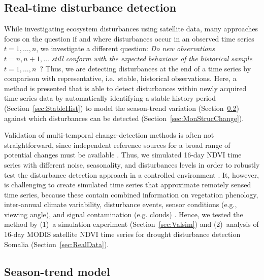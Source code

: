 \documentclass[authoryear,preprint,review,10pt]{elsarticle}
\begin{document}
\subsection{Real-time disturbance detection}\label{sec:Method}

While investigating ecosystem disturbances using satellite data, many approaches \citep[e.g.,][]{Verbesselt:2010wo, White2009} focus on the question if and where disturbances occur in an observed time series $t = 1, \dots, n$, we investigate a different question: \emph{Do new observations $t = n, n + 1, \dots$ still conform with the expected behaviour of the historical sample $t = 1, \dots, n$}~? Thus, we are detecting disturbances at the end of a time series by comparison with representative, i.e.\ stable, historical observations. Here, a method is presented that is able to detect disturbances within newly acquired time series data by automatically identifying a stable history period (Section~\ref{sec:StableHist}) to model the season-trend variation (Section~\ref{sec:seasontrendmodel}) against which disturbances can be detected (Section~\ref{sec:MonStrucChange}).

Validation of multi-temporal change-detection methods is often not straightforward, since independent reference sources for a broad range of potential changes must be available \citep{Kennedy2007}. Thus, we simulated 16-day NDVI time series with different noise, seasonality, and disturbances levels in order to robustly test the disturbance detection approach in a controlled environment \citep{Verbesselt2009a, Verbesselt:2010wo}. It, however, is challenging to create simulated time series that approximate remotely sensed time series, because these contain combined information on vegetation phenology, inter-annual climate variability, disturbance events, sensor conditions (e.g., viewing angle), and signal contamination (e.g. clouds) \citep{Zhang2009}. Hence, we tested the method by (1)~a simulation experiment (Section~\ref{sec:Valsim}) and (2)~analysis of 16-day MODIS satellite NDVI time series for drought disturbance detection Somalia (Section~\ref{sec:RealData}). 

\subsection{Season-trend model}\label{sec:seasontrendmodel}
\end{document}

